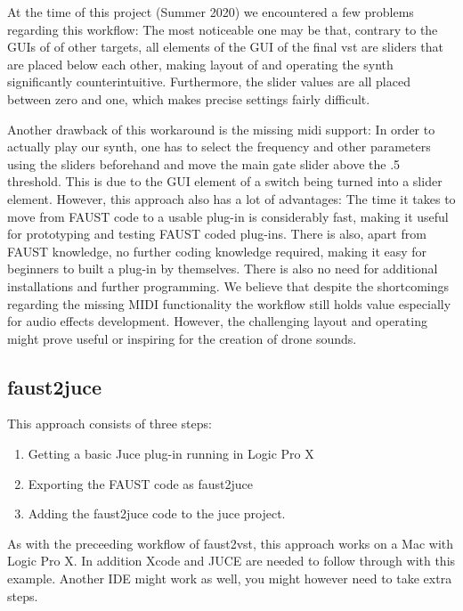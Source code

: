 \documentclass{aes2e}
\begin{document}
At the time of this project (Summer 2020) we encountered a few problems regarding this workflow: The most noticeable one may be that, contrary to the GUIs of of other targets, all elements of the GUI of the final vst are sliders that are placed below each other, making layout of and operating the synth significantly counterintuitive. Furthermore, the slider values are all placed between zero and one, which makes precise settings fairly difficult.

Another drawback of this workaround is the missing midi support: In order to actually play our synth, one has to select the frequency and other parameters using the sliders beforehand and move the main gate slider above the .5 threshold. This is due to the GUI element of a switch being turned into a slider element.
However, this approach also has a lot of advantages: The time it takes to move from FAUST code to a usable plug-in is considerably fast, making it useful for prototyping and testing FAUST coded plug-ins. There is also, apart from FAUST knowledge, no further coding knowledge required, making it easy for beginners to built a plug-in by themselves. There is also no need for additional installations and further programming.
We believe that despite the shortcomings regarding the missing MIDI functionality the workflow still holds value especially for audio effects development. However, the challenging layout and operating might prove useful or inspiring for the creation of drone sounds.

\subsection{faust2juce}
This approach consists of three steps:
\begin{enumerate}
    \item Getting a basic Juce plug-in running in Logic Pro X
    \item Exporting the FAUST code as faust2juce
    \item Adding the faust2juce code to the juce project.
\end{enumerate}
As with the preceeding workflow of faust2vst, this approach works on a Mac with Logic Pro X. In addition Xcode and JUCE are needed to follow through with this example. Another IDE might work as well, you might however need to take extra steps.
\end{document}
